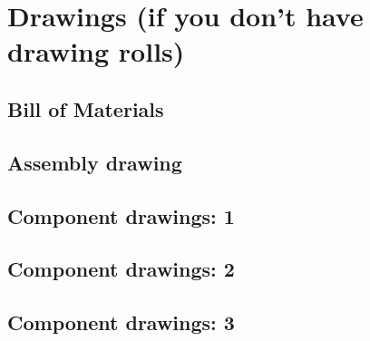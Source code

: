 \chapter{Drawings (if you don't have drawing rolls)}
\section{Bill of Materials}
\section{Assembly drawing}
\section{Component drawings: 1}
\section{Component drawings: 2}
\section{Component drawings: 3}
